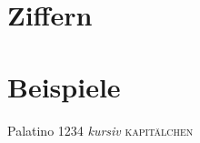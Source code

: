 
\section{Ziffern}
\label{sec:Ziffern}


\section{Beispiele}

{\selectfont Palatino 1234 \emph{kursiv} \textsc{kapitälchen}}


